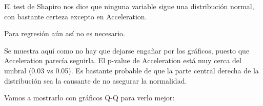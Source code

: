 \documentclass[
]{article}
\newenvironment{Shaded}{\begin{snugshade}}{\end{snugshade}}
\newcommand{\ControlFlowTok}[1]{\textcolor[rgb]{0.13,0.29,0.53}{\textbf{#1}}}
\newcommand{\DataTypeTok}[1]{\textcolor[rgb]{0.13,0.29,0.53}{#1}}
\newcommand{\DecValTok}[1]{\textcolor[rgb]{0.00,0.00,0.81}{#1}}
\newcommand{\KeywordTok}[1]{\textcolor[rgb]{0.13,0.29,0.53}{\textbf{#1}}}
\newcommand{\NormalTok}[1]{#1}
\newcommand{\OperatorTok}[1]{\textcolor[rgb]{0.81,0.36,0.00}{\textbf{#1}}}
\newcommand{\StringTok}[1]{\textcolor[rgb]{0.31,0.60,0.02}{#1}}
\begin{document}
El test de Shapiro nos dice que ninguna variable sigue una distribución
normal, con bastante certeza excepto en Acceleration.

Para regresión aún así no es necesario.

Se muestra aquí como no hay que dejarse engañar por los gráficos, puesto
que Acceleration parecía seguirla. El p-value de Acceleration está muy
cerca del umbral (0.03 vs 0.05). Es bastante probable de que la parte
central derecha de la distribución sea la causante de no asegurar la
normalidad.

Vamos a mostrarlo con gráficos Q-Q para verlo mejor:

\begin{Shaded}
\end{Shaded}
\end{document}
